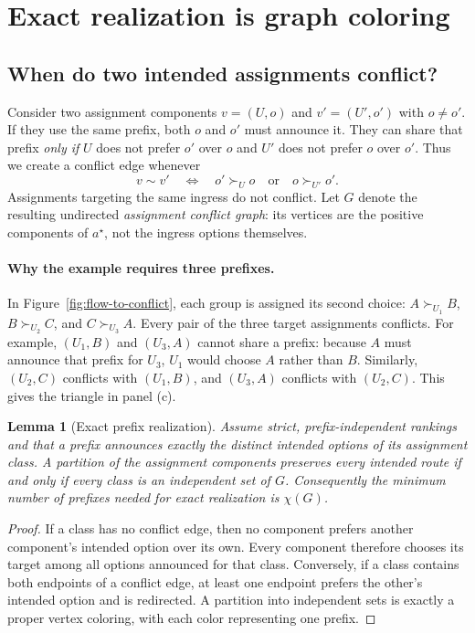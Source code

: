 \documentclass[10pt,a4paper]{article}
\newtheorem{lemma}[theorem]{Lemma}
\begin{document}
\section{Exact realization is graph coloring}
\label{sec:graph}

\subsection{When do two intended assignments conflict?}

Consider two assignment components $v=(U,o)$ and $v'=(U',o')$ with $o\ne o'$. If they use the same prefix, both $o$ and $o'$ must announce it. They can share that prefix \emph{only if} $U$ does not prefer $o'$ over $o$ and $U'$ does not prefer $o$ over $o'$. Thus we create a conflict edge whenever
\begin{equation}\label{eq:edge}
v\sim v'
\quad\Longleftrightarrow\quad
o'\succ_U o\quad\text{or}\quad o\succ_{U'}o'.
\end{equation}
Assignments targeting the same ingress do not conflict. Let $G$ denote the resulting undirected \emph{assignment conflict graph}: its vertices are the positive components of $a^\star$, not the ingress options themselves.

\paragraph{Why the example requires three prefixes.}
In Figure~\ref{fig:flow-to-conflict}, each group is assigned its second choice:
$A\succ_{U_1} B$, $B\succ_{U_2} C$, and $C\succ_{U_3} A$.
Every pair of the three target assignments conflicts. For example, $(U_1,B)$ and $(U_3,A)$ cannot share a prefix: because $A$ must announce that prefix for $U_3$, $U_1$ would choose $A$ rather than $B$. Similarly, $(U_2,C)$ conflicts with $(U_1,B)$, and $(U_3,A)$ conflicts with $(U_2,C)$. This gives the triangle in panel (c).



\begin{lemma}[Exact prefix realization]\label{lem:color}
Assume strict, prefix-independent rankings and that a prefix announces exactly the distinct intended options of its assignment class. A partition of the assignment components preserves every intended route if and only if every class is an independent set of $G$. Consequently the minimum number of prefixes needed for exact realization is $\chi(G)$.
\end{lemma}
\begin{proof}
If a class has no conflict edge, then no component prefers another component's intended option over its own. Every component therefore chooses its target among all options announced for that class. Conversely, if a class contains both endpoints of a conflict edge, at least one endpoint prefers the other's intended option and is redirected. A partition into independent sets is exactly a proper vertex coloring, with each color representing one prefix.
\end{proof}
\end{document}
